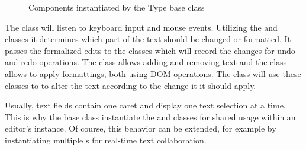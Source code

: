 \begin{figure}[!htb]
\centering
{}
\caption{Components instantiated by the Type base class}
\label{fig:type_base_components}
\end{figure}


\noindent The  class will listen to keyboard input and mouse events. Utilizing the  and  classes it determines which part of the text should be changed or formatted. It passes the formalized edits to the  classes which will record the changes for undo and redo operations. The  class allows adding and removing text and the  class allows to apply formattings, both using DOM operations. The  class will use these classes to to alter the text according to the change it it should apply.

Usually, text fields contain one caret and display one text selection at a time. This is why the  base class instantiate the  and  classes for shared usage within an editor's instance. Of course, this behavior can be extended, for example by instantiating multiple s for real-time text collaboration.



